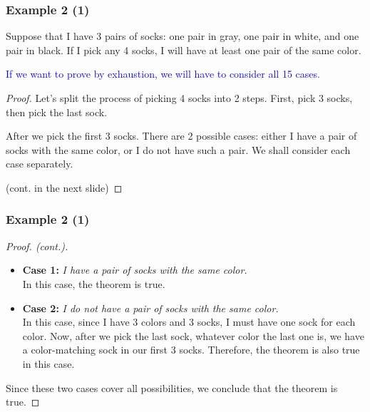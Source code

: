 \begin{frame}\frametitle{Example 2 (1)}
  \begin{theorem}
    Suppose that I have 3 pairs of socks: one pair in gray, one pair
    in white, and one pair in black.  If I pick any 4 socks, I will
    have at least one pair of the same color.
  \end{theorem}
  \pause

  \textcolor{blue}{If we want to prove by exhaustion, we will have to
    consider all 15 cases.}
  \pause
  
  \begin{proof}
    Let's split the process of picking 4 socks into 2 steps.  First,
    pick 3 socks, then pick the last sock.

    After we pick the first 3 socks.  There are 2 possible cases:
    either I have a pair of socks with the same color, or I do not
    have such a pair.  We shall consider each case separately.

    (cont. in the next slide)
  \end{proof}
\end{frame}

\begin{frame}\frametitle{Example 2 (1)}
  \begin{proof}[Proof. (cont.)]
    \begin{itemize}
    \item
      {\bf Case 1:} {\em I have a pair of socks with the same color.} \\
      \pause
      In this case, the theorem is true.
      \pause
    \item
      {\bf Case 2:} {\em I do not have a pair of socks with the same
      color.} \\
      \pause
      In this case, since I have 3 colors and 3 socks, I must have one
      sock for each color.  Now, after we pick the last sock, whatever
      color the last one is, we have a color-matching sock in our
      first 3 socks.  Therefore, the theorem is also true in this
      case.
    \end{itemize}
    \pause

    Since these two cases cover all possibilities, we conclude that
    the theorem is true.
  \end{proof}
\end{frame}

